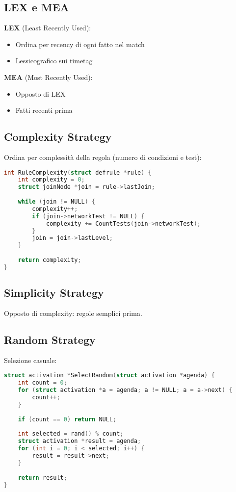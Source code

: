 \subsection{LEX e MEA}

\textbf{LEX} (Least Recently Used):
\begin{itemize}
\item Ordina per recency di ogni fatto nel match
\item Lessicografico sui timetag
\end{itemize}

\textbf{MEA} (Most Recently Used):
\begin{itemize}
\item Opposto di LEX
\item Fatti recenti prima
\end{itemize}

\subsection{Complexity Strategy}

Ordina per complessità della regola (numero di condizioni e test):

\begin{lstlisting}[language=C]
int RuleComplexity(struct defrule *rule) {
    int complexity = 0;
    struct joinNode *join = rule->lastJoin;
    
    while (join != NULL) {
        complexity++;
        if (join->networkTest != NULL) {
            complexity += CountTests(join->networkTest);
        }
        join = join->lastLevel;
    }
    
    return complexity;
}
\end{lstlisting}

\subsection{Simplicity Strategy}

Opposto di complexity: regole semplici prima.

\subsection{Random Strategy}

Selezione casuale:

\begin{lstlisting}[language=C]
struct activation *SelectRandom(struct activation *agenda) {
    int count = 0;
    for (struct activation *a = agenda; a != NULL; a = a->next) {
        count++;
    }
    
    if (count == 0) return NULL;
    
    int selected = rand() % count;
    struct activation *result = agenda;
    for (int i = 0; i < selected; i++) {
        result = result->next;
    }
    
    return result;
}
\end{lstlisting}

